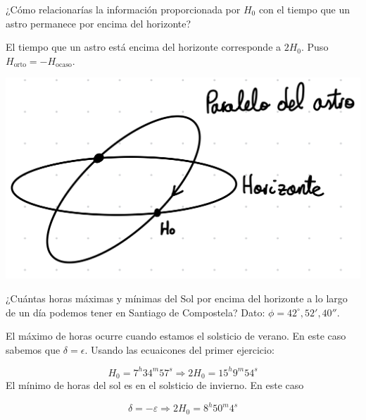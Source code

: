 \begin{texercise}
	 ¿Cómo relacionarías la información proporcionada por $H_0$ con el tiempo que un astro permanece por encima del horizonte?
	 \tcblower
	 
	 \begin{minipage}{.45\textwidth} 	
	 	El tiempo que un astro está encima del horizonte corresponde a $2H_0$. Puso $H_{\text{orto}}=-H_{\text{ocaso}}$.
	 \end{minipage}	\hfill
	 \begin{minipage}{0.45\textwidth} 
	 	\includegraphics[width=1.0\textwidth]{Cuerpo/Imagenes/01_Ejercicio_2.jpg}
	 \end{minipage}
	 
	 
\end{texercise}

\begin{texercise}
	¿Cuántas horas máximas y mínimas del Sol por encima del horizonte a lo largo de un día podemos tener en Santiago de Compostela? Dato: $\phi=42^\circ,52',40''$.
	 \tcblower
		 
	El máximo de horas ocurre cuando estamos el solsticio de verano. En este caso sabemos que $\delta=\epsilon$. Usando las ecuaicones del primer ejercicio:
		 
	 \begin{equation}
	 	H_0 = 7^h 34^m 57^s \Rightarrow 2H_0 = 15^h 9^m 54^s
	 \end{equation}
	 El mínimo de horas del sol es en el solsticio de invierno.  En este caso
		 
	 \begin{equation}
	 	\delta = - \varepsilon \Rightarrow 2H_0 = 8^h 50^m 4^s
	 \end{equation}
\end{texercise}


